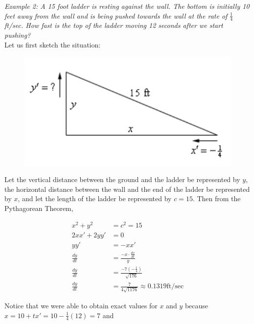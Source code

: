         \noindent \color{blue} \textit{Example 2: A 15 foot ladder is resting against the wall.
        The bottom is initially 10 feet away from the wall and is being pushed towards the wall at
        the rate of $\frac{1}{4}$ ft/sec. How fast is the top of the ladder moving 12 seconds
        after we start pushing?} \color{black} \\

        \noindent Let us first sketch the situation: \\

        \begin{figure}[hbt!]
            \centering
            \includegraphics[scale=0.6]{Resources/Unit3DiffferentiationApps/Related_Rates_1}
        \end{figure}

        \noindent Let the vertical distance between the ground and the ladder be represented by $y$,
        the horizontal distance between the wall and the end of the ladder be represented by $x$,
        and let the length of the ladder be represented by $c=15$. Then from the Pythagorean Theorem,

        \begin{align*}
            x^2 + y^2       &= c^2 = 15 \\
            2xx' + 2yy'     &= 0 \\
            yy'             &= -xx' \\
            \frac{dy}{dt}   &= \frac{-x\cdot\frac{dx}{dt}}{y} \\
            \frac{dy}{dt}   &= \frac{-7(-\frac{1}{4})}{\sqrt{176}} \\
            \frac{dy}{dt}   &= \frac{7}{4\sqrt{1176}} \approx 0.1319 \text{ft/sec}
        \end{align*}

        Notice that we were able to obtain exact values for $x$ and $y$ because
        $x=10+tx'=10-\frac{1}{4}(12) = 7$ and

